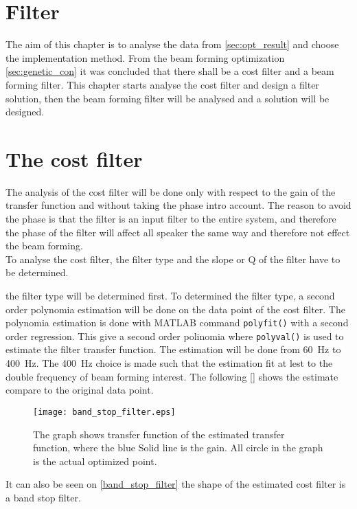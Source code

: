 \section{Filter}\label{sec:filter_design}

The aim of this chapter is to analyse the data from \ref{sec:opt_result} and choose the implementation method. From the beam forming optimization \autoref{sec:genetic_con} it was concluded that there shall be a cost filter and a beam forming filter. This chapter starts analyse the cost filter and design a filter solution, then the beam forming filter will be analysed and a solution will be designed.


\section{The cost filter}
The analysis of the cost filter will be done only with respect to the gain of the transfer function and without taking the phase intro account. The reason to avoid the phase is that the filter is an input filter to the entire system, and therefore the phase of the filter will affect all speaker the same way and therefore not effect the beam forming. \\
To analyse the cost filter, the filter type and the slope or Q of the filter have to be determined. 

the filter type will be determined first. To determined the filter type, a second order polynomia estimation will be done on the data point of the cost filter. The polynomia estimation is done with MATLAB command \texttt{polyfit()} with a second order regression. This give a second order polinomia where  \texttt{polyval()} is used to estimate the filter transfer function. The estimation will be done from \SI{60}{\hertz} to \SI{400}{\hertz}. The \SI{400}{\hertz} choice is made such that the estimation fit at lest to the double frequency of beam forming interest. The following \autoref{} shows the estimate compare to the original data point.

\begin{figure}[H]
	\centering
	\texttt{[image: band\_stop\_filter.eps]}
	\caption{The graph shows transfer function of the estimated transfer function, where the blue  Solid line is the gain. All circle in the graph is the actual optimized point.}
		\label{fig:band_stop_filter}
\end{figure}
It can also be seen on \autoref{band_stop_filter} the shape of the estimated cost filter is a band stop filter. \\

